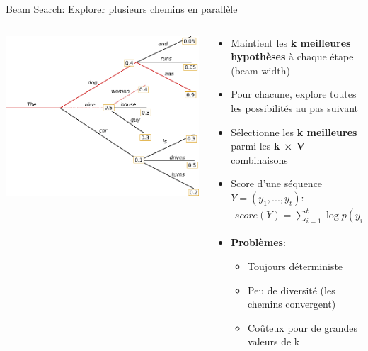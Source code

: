 \documentclass[aspectratio=169]{beamer}
\begin{document}
\begin{frame}{Beam Search: Explorer plusieurs chemins en parallèle}
    \begin{columns}
        \begin{column}{0.5\textwidth}
            \begin{center}
                \includegraphics[width=\textwidth]{images/beam.png}
            \end{center}
        \end{column}
        \begin{column}{0.5\textwidth}
            \begin{itemize}
                \item Maintient les \textbf{k meilleures hypothèses} à chaque étape (beam width)
                \item Pour chacune, explore toutes les possibilités au pas suivant
                \item Sélectionne les \textbf{k meilleures} parmi les \textbf{k × V} combinaisons
                \item Score d'une séquence $Y = (y_1, ..., y_t)$:
                \begin{align*}
                    score(Y) = \sum_{i=1}^{t} \log p(y_i|y_{1:i-1})
                \end{align*}
                \item \textbf{Problèmes}:
                \begin{itemize}
                    \item Toujours déterministe
                    \item Peu de diversité (les chemins convergent)
                    \item Coûteux pour de grandes valeurs de k
                \end{itemize}
            \end{itemize}
        \end{column}
    \end{columns}
\end{frame}
\end{document}
